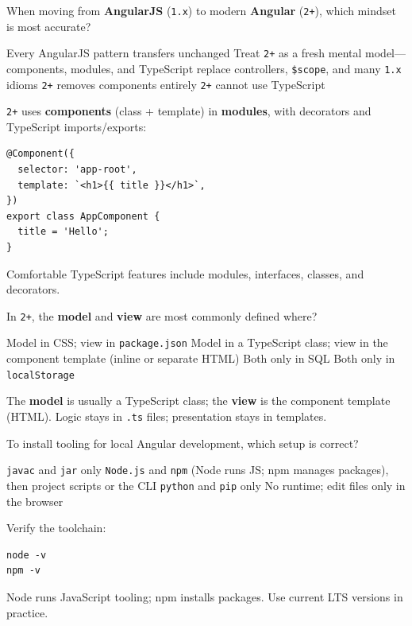 \question[4]
When moving from \textbf{AngularJS} (\texttt{1.x}) to modern \textbf{Angular} (\texttt{2+}), which mindset is most accurate?
\begin{choices}
  \choice Every AngularJS pattern transfers unchanged
  \CorrectChoice Treat \texttt{2+} as a fresh mental model---components, modules, and TypeScript replace controllers, \texttt{\$scope}, and many \texttt{1.x} idioms
  \choice \texttt{2+} removes components entirely
  \choice \texttt{2+} cannot use TypeScript
\end{choices}
\begin{solution}
  \texttt{2+} uses \textbf{components} (class + template) in \textbf{modules}, with decorators and TypeScript imports/exports:
\begin{lstlisting}[style=ts]
@Component({
  selector: 'app-root',
  template: `<h1>{{ title }}</h1>`,
})
export class AppComponent {
  title = 'Hello';
}
\end{lstlisting}
  Comfortable TypeScript features include modules, interfaces, classes, and decorators.
\end{solution}

\question[4]
In \texttt{2+}, the \textbf{model} and \textbf{view} are most commonly defined where?
\begin{choices}
  \choice Model in CSS; view in \texttt{package.json}
  \CorrectChoice Model in a TypeScript class; view in the component template (inline or separate HTML)
  \choice Both only in SQL
  \choice Both only in \texttt{localStorage}
\end{choices}
\begin{solution}
  The \textbf{model} is usually a TypeScript class; the \textbf{view} is the component template (HTML). Logic stays in \lstinline[style=tsinline]{.ts} files; presentation stays in templates.
\end{solution}

\question[4]
To install tooling for local Angular development, which setup is correct?
\begin{choices}
  \choice \texttt{javac} and \texttt{jar} only
  \CorrectChoice \texttt{Node.js} and \texttt{npm} (Node runs JS; npm manages packages), then project scripts or the CLI
  \choice \texttt{python} and \texttt{pip} only
  \choice No runtime; edit files only in the browser
\end{choices}
\begin{solution}
  Verify the toolchain:
\begin{lstlisting}[style=bash]
node -v
npm -v
\end{lstlisting}
  Node runs JavaScript tooling; npm installs packages. Use current LTS versions in practice.
\end{solution}

